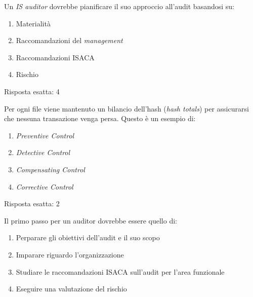 \begin{Exercise} [
  title={Quiz},
  label={audit3}
  ]

  \Question Un \textit{IS auditor} dovrebbe pianificare il suo approccio 
all'audit basandosi su:
\begin{enumerate}
 \item Materialità
 \item Raccomandazioni del \textit{management}
 \item Raccomandazioni ISACA
 \item Rischio
\end{enumerate}
  
\end{Exercise}


\begin{Answer} [
  ref={audit3},
  number={3}
  ]

  \Question Risposta esatta: 4

\end{Answer}

\begin{Exercise} [
  title={Quiz},
  label={audit4}
  ]

  \Question Per ogni file viene mantenuto un bilancio dell'hash 
  (\textit{hash totals}) per assicurarsi che nessuna transazione venga
  persa. Questo è un esempio di:
  
\begin{enumerate}
 \item \textit{Preventive Control}
 \item \textit{Detective Control}
 \item \textit{Compensating Control}
 \item \textit{Corrective Control}
\end{enumerate}

\end{Exercise}


\begin{Answer} [
  ref={audit4},
  number={4}
  ]

  \Question Risposta esatta: 2

\end{Answer}

\begin{Exercise} [
  title={Quiz},
  label={audit5}
  ]

  \Question Il primo passo per un auditor dovrebbe essere quello di:
  \begin{enumerate}
   \item Perparare gli obiettivi dell'audit e il suo scopo
   \item Imparare riguardo l'organizzazione
   \item Studiare le raccomandazioni ISACA sull'audit per l'area funzionale
   \item Eseguire una valutazione del rischio
  \end{enumerate}

\end{Exercise}


